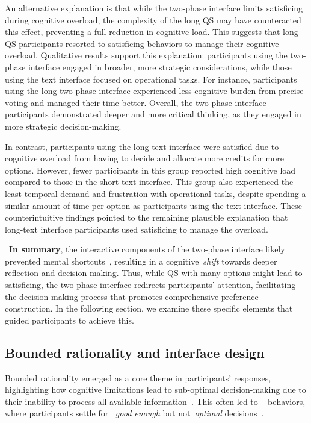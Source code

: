 An alternative explanation is that while the two-phase interface limits satisficing during cognitive overload, the complexity of the long QS may have counteracted this effect, preventing a full reduction in cognitive load. This suggests that long QS participants resorted to satisficing behaviors to manage their cognitive overload. Qualitative results support this explanation: participants using the two-phase interface engaged in broader, more strategic considerations, while those using the text interface focused on operational tasks. For instance, participants using the long two-phase interface experienced less cognitive burden from precise voting and managed their time better. Overall, the two-phase interface participants demonstrated deeper and more critical thinking, as they engaged in more strategic decision-making.

In contrast, participants using the long text interface were satisfied due to cognitive overload from having to decide and allocate more credits for more options. However, fewer participants in this group reported high cognitive load compared to those in the short-text interface. This group also experienced the least temporal demand and frustration with operational tasks, despite spending a similar amount of time per option as participants using the text interface. These counterintuitive findings pointed to the remaining plausible explanation that long-text interface participants used satisficing to manage the overload.

~\textbf{In summary}, the interactive components of the two-phase interface likely prevented mental shortcuts~\cite{daniel2017thinking, simonBehavioralModelRational1955, payneAdaptiveStrategySelection1988, tverskyJudgmentsRepresentativeness}, resulting in a cognitive~\textit{shift} towards deeper reflection and decision-making. Thus, while QS with many options might lead to satisficing, the two-phase interface redirects participants' attention, facilitating the decision-making process that promotes comprehensive preference construction. In the following section, we examine these specific elements that guided participants to achieve this.

\subsection{Bounded rationality and interface design}
Bounded rationality emerged as a core theme in participants' responses, highlighting how cognitive limitations lead to sub-optimal decision-making due to their inability to process all available information~\cite{simonBehavioralModelRational1955}. This often led to ~\textit{} behaviors, where participants settle for ~\textit{good enough} but not~\textit{optimal} decisions~\cite{gigerenzerReasoningFastFrugal1996}.

